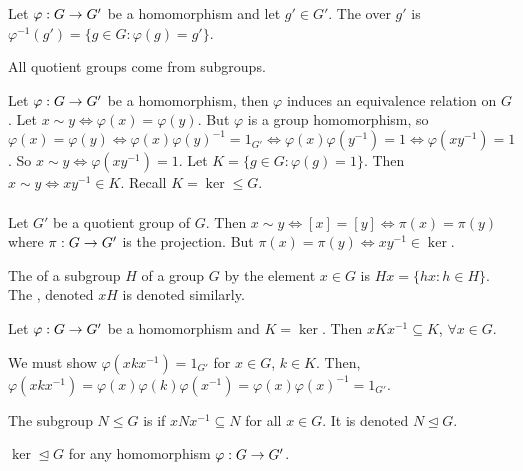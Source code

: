 \documentclass[11pt,letterpaper]{jacky}
\begin{document}
\begin{defi}
    Let $\hmap{G}{G'}$ be a homomorphism and let $g'\in G'$. The  over $g'$ is $\varphi^{-1}(g')=\{g\in G:\varphi(g)=g'\}$.
\end{defi}

\begin{bprop}
    All quotient groups come from subgroups.
\end{bprop}

\begin{bpf}
    Let $\hmap{G}{G'}$ be a homomorphism, then $\varphi$ induces an equivalence relation on $G$. Let $x\sim y\Leftrightarrow\varphi(x)=\varphi(y)$. But $\varphi$ is a group homomorphism, so $\varphi(x)=\varphi(y)\Leftrightarrow\varphi(x)\varphi(y)^{-1}=1_{G'}\Leftrightarrow\varphi(x)\varphi(y^{-1})=1\Leftrightarrow\varphi(xy^{-1})=1$. So $x\sim y\Leftrightarrow\varphi(xy^{-1})=1$. Let $K=\{g\in G:\varphi(g)=1\}$. Then $x\sim y\Leftrightarrow xy^{-1}\in K$. Recall $K=\ker\le G$.\\\\
    Let $G'$ be a quotient group of $G$. Then $x\sim y\Leftrightarrow[x]=[y]\Leftrightarrow\pi(x)=\pi(y)$ where $\hmap[\pi]{G}{G'}$ is the projection. But $\pi(x)=\pi(y)\Leftrightarrow xy^{-1}\in\ker$.
\end{bpf}

\begin{defi}
    The  of a subgroup $H$ of a group $G$ by the element $x\in G$ is $Hx=\{hx:h\in H\}$. The , denoted $xH$ is denoted similarly.
\end{defi}

\begin{prop}
    Let $\hmap{G}{G'}$ be a homomorphism and $K=\ker$. Then $xKx^{-1}\subseteq K$, $\forall x\in G$.
\end{prop}

\begin{pf}
    We must show $\varphi(xkx^{-1})=1_{G'}$ for $x\in G$, $k\in K$. Then, $\varphi(xkx^{-1})=\varphi(x)\varphi(k)\varphi(x^{-1})=\varphi(x)\varphi(x)^{-1}=1_{G'}$.
\end{pf}

\begin{bdefi}
    The subgroup $N\le G$ is  if $xNx^{-1}\subseteq N$ for all $x\in G$. It is denoted $N\unlhd G$.
\end{bdefi}

\begin{prop}
    $\ker\unlhd G$ for any homomorphism $\hmap{G}{G'}$.
\end{prop}
\end{document}
